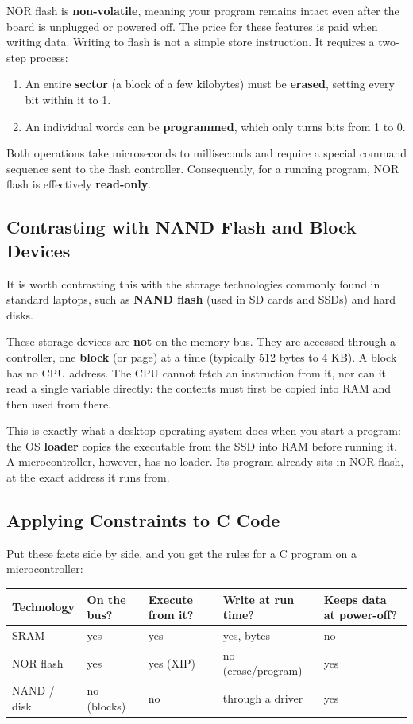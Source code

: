 NOR flash is \textbf{non-volatile}, meaning your program remains intact even after the board is unplugged or powered off. The price for these features is paid when writing data. Writing to flash is not a simple store instruction. It requires a two-step process: 

\begin{enumerate}
    \item An entire \textbf{sector} (a block of a few kilobytes) must be \textbf{erased}, setting every bit within it to 1. 
    \item An individual words can be \textbf{programmed}, which only turns bits from 1 to 0.
\end{enumerate}

Both operations take microseconds to milliseconds and require a special command sequence sent to the flash controller. Consequently, for a running program, NOR flash is effectively \textbf{read-only}.

\subsection{Contrasting with NAND Flash and Block Devices}
It is worth contrasting this with the storage technologies commonly found in standard laptops, such as \textbf{NAND flash} (used in SD cards and SSDs) and hard disks. 

These storage devices are \textbf{not} on the memory bus. They are accessed through a controller, one \textbf{block} (or page) at a time (typically 512 bytes to 4 KB). A block has no CPU address. The CPU cannot fetch an instruction from it, nor can it read a single variable directly: the contents must first be copied into RAM and then used from there. 

This is exactly what a desktop operating system does when you start a program: the OS \textbf{loader} copies the executable from the SSD into RAM before running it. A microcontroller, however, has no loader. Its program already sits in NOR flash, at the exact address it runs from.

\subsection{Applying Constraints to C Code}
Put these facts side by side, and you get the rules for a C program on a microcontroller:

\begin{table}[h!]
    \centering
    \begin{tabular}{|l|l|l|l|l|}
        \hline
        \textbf{Technology} & \textbf{On the bus?} & \textbf{Execute from it?} & \textbf{Write at run time?} & \textbf{Keeps data at power-off?} \\ \hline
        SRAM & yes & yes & yes, bytes & no \\ \hline
        NOR flash & yes & yes (XIP) & no (erase/program) & yes \\ \hline
        NAND / disk & no (blocks) & no & through a driver & yes \\ \hline
    \end{tabular}
\end{table}


